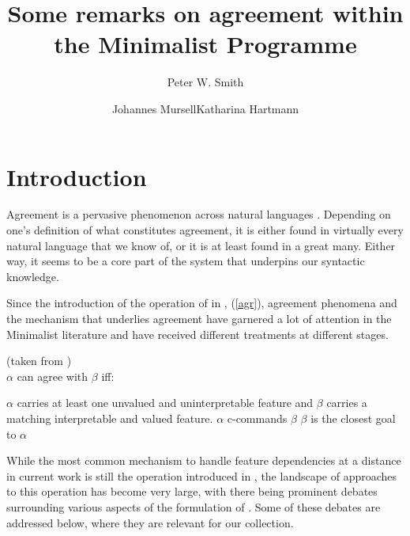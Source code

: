 \documentclass[output=paper
,modfonts
,nonflat]{langsci/langscibook}
\title{Some remarks on agreement within the Minimalist Programme}
\author{Peter W. Smith\affiliation{Goethe-University Frankfurt}\and Johannes Mursell\affiliation{Goethe-University Frankfurt}\lastand Katharina Hartmann\affiliation{Goethe-University Frankfurt}}
\begin{document}
\maketitle
\section{Introduction}
\label{secintro}

Agreement is a pervasive phenomenon across natural languages \citep{corbett2006}. Depending on one's definition of what constitutes agreement, it is either found in virtually every natural language that we know of, or it is at least found in a great many. Either way, it seems to be a core part of the system that underpins our syntactic knowledge.

Since the introduction of the operation of \agr{} in \citet{Chomsky2000}, (\ref{agr}), agreement phenomena and the mechanism that underlies agreement have garnered a lot of attention in the Minimalist literature and have received different treatments at different stages.

\begin{exe}
	\ex \agr{} (taken from \citealp{Zeijlstra2012})\\
	$\alpha$ can agree with $\beta$ iff:
	\begin{xlista}
		\ex $\alpha$ carries at least one unvalued and uninterpretable feature and $\beta$ carries a matching interpretable and valued feature.
		\ex $\alpha$ c-commands $\beta$
		\ex $\beta$ is the closest goal to $\alpha$
	\end{xlista} \label{agr}
\end{exe}
While the most common mechanism to handle feature dependencies at a distance in current work is still the operation {\agr} introduced in \citet{Chomsky2000}, the landscape of approaches to this operation has become very large, with there being prominent debates surrounding various aspects of the formulation of \agr.
Some of these debates are addressed below, where they are relevant for our collection.
\end{document}
